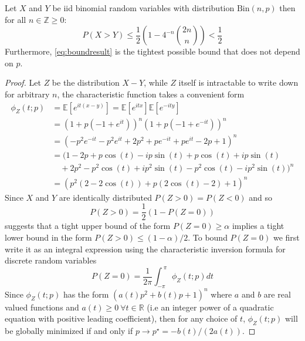 \begin{lemma}
    \label{lemma:bound}
    Let $X$ and $Y$ be iid binomial random variables with distribution $\text{Bin}(n,p)$ then for all $n\in \mathbb{Z}\geq 0$:
    \begin{equation}
        P(X>Y) \leq \frac{1}{2}\left(1-4^{-n} \binom{2n}{n} \right) < \frac{1}{2}
        \label{eq:boundresult}
    \end{equation}
    Furthermore, \cref{eq:boundresult} is the tightest possible bound that does not depend on $p$.
\end{lemma}
\begin{proof}
    Let $Z$ be the distribution $X-Y$, while $Z$ itself is intractable to write down for arbitrary $n$, the characteristic function takes a convenient form
    \begin{align}
        \phi_Z(t;p) &= \mathbb{E}\left[e^{i t (x - y)}\right] = \mathbb{E}\left[e^{i t x}\right] \mathbb{E}\left[e^{-i t y}\right]\\
        &=\left(1+p \left(-1+e^{i t}\right)\right)^n \left(1+p \left(-1+e^{-i t}\right)\right)^n\\
        &=\left(-p^2 e^{-i t}-p^2 e^{i t}+2 p^2+p e^{-i t}+p e^{i t}-2 p+1\right)^n\\
        &=(1-2 p+p \cos (t)-i p \sin (t)+p \cos (t)+i p \sin (t)\\
        &\quad +2 p^2-p^2 \cos (t)+i p^2 \sin (t)-p^2\cos (t)-i p^2 \sin (t))^n \nonumber \\
        &=\left(p^2 (2-2 \cos (t))+p (2 \cos (t)-2)+1\right)^n
    \end{align}
    Since $X$ and $Y$ are identically distributed $P(Z>0) = P(Z<0)$ and so
    \begin{equation}
        P(Z>0) = \frac{1}{2}\left(1 - P(Z=0)\right)
        \label{eq:pz}
    \end{equation}
     suggests that a tight upper bound of the form $P(Z=0)\geq \alpha$ implies a tight lower bound in the form $P(Z> 0) \leq (1-\alpha)/2$.
    To bound $P(Z=0)$ we first write it as an integral expression using the characteristic inversion formula for discrete random variables~\citep{ushakov_2011}
    \begin{equation}
        P(Z=0) = \frac{1}{2 \pi}\int_{-\pi}^{\ \pi} \phi_Z(t;p)d t
        \label{eq:prob0}
    \end{equation}
    Since $\phi_Z(t;p)$ has the form $(a(t) p^2 + b(t) p + 1)^n$ where $a$ and $b$ are real valued functions and $a(t) \geq 0\ \forall t \in \mathbb{R}$ (i.e an integer power of a quadratic equation with positive leading coefficient), then for any choice of $t$, $\phi_Z(t;p)$  will be globally minimized if and only if $p\to p^{\star}=-b(t)/\left(2 a(t)\right)$.

\end{proof}
